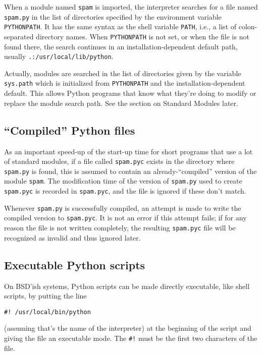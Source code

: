 When a module named {\tt spam} is imported, the interpreter searches
for a file named {\tt spam.py} in the list of directories specified by
the environment variable {\tt PYTHONPATH}.  It has the same syntax as
the {\UNIX} shell variable {\tt PATH}, i.e., a list of colon-separated
directory names.  When {\tt PYTHONPATH} is not set, or when the file
is not found there, the search continues in an installation-dependent
default path, usually {\tt .:/usr/local/lib/python}.

Actually, modules are searched in the list of directories given by the
variable {\tt sys.path} which is initialized from {\tt PYTHONPATH} and
the installation-dependent default.  This allows Python programs that
know what they're doing to modify or replace the module search path.
See the section on Standard Modules later.

\subsection{``Compiled'' Python files}

As an important speed-up of the start-up time for short programs that
use a lot of standard modules, if a file called {\tt spam.pyc} exists
in the directory where {\tt spam.py} is found, this is assumed to
contain an already-``compiled'' version of the module {\tt spam}.  The
modification time of the version of {\tt spam.py} used to create {\tt
spam.pyc} is recorded in {\tt spam.pyc}, and the file is ignored if
these don't match.

Whenever {\tt spam.py} is successfully compiled, an attempt is made to
write the compiled version to {\tt spam.pyc}.  It is not an error if
this attempt fails; if for any reason the file is not written
completely, the resulting {\tt spam.pyc} file will be recognized as
invalid and thus ignored later.

\subsection{Executable Python scripts}

On BSD'ish {\UNIX} systems, Python scripts can be made directly
executable, like shell scripts, by putting the line

\bcode\begin{verbatim}
#! /usr/local/bin/python
\end{verbatim}\ecode
%
(assuming that's the name of the interpreter) at the beginning of the
script and giving the file an executable mode.  The {\tt \#!} must be
the first two characters of the file.


